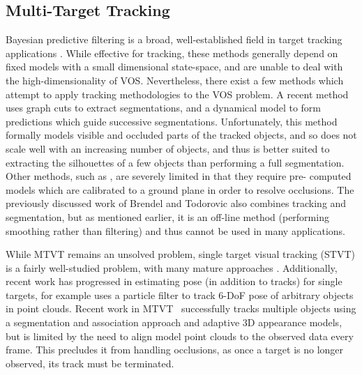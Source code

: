 \subsection{Multi-Target Tracking}
Bayesian predictive filtering is a broad, well-established field in target tracking applications \cite{TrackingMultipleParticleFiltering,MonteCarloMTT,SequentialMonteCarloMultitargetFiltering}. While effective for tracking, these methods generally depend on fixed models with a small dimensional state-space, and are unable to deal with the high-dimensionality of VOS. Nevertheless, there exist a few methods which attempt to apply tracking methodologies to the VOS problem. A recent method \cite{TrackingOcclusionsGraphCuts} uses graph cuts to extract segmentations, and a dynamical model to form predictions which guide successive segmentations. Unfortunately, this method formally models visible and occluded parts of the tracked objects, and so does not scale well with an increasing number of objects, and thus is better suited to extracting the silhouettes of a few objects than performing a full segmentation. Other methods, such as \cite{LayeredGraphicalModels}, are severely limited in that they require pre-
computed models which are calibrated to a ground plane in order to resolve occlusions. The previously discussed work of Brendel and Todorovic  \cite{SegTrackRegions} also combines tracking and segmentation, but as mentioned earlier, it is an off-line method (performing smoothing rather than filtering) and thus cannot be used in many applications.

While MTVT remains an unsolved problem, single target visual tracking (STVT) is a fairly well-studied problem, with many mature approaches \cite{RobustTrackingBabenko, StructuredSparseRepresentation}. Additionally, recent work has progressed in estimating pose (in addition to tracks) for single targets, for example \cite{6DOFTracking} uses a particle filter to track 6-DoF pose of arbitrary objects in point clouds. Recent work in MTVT~\cite{MultiObjectTracking} successfully tracks multiple objects using a segmentation and association approach and adaptive 3D appearance models, but is limited by the need to align model point clouds to the observed data every frame. This precludes it from handling occlusions, as once a target is no longer observed, its track must be terminated.

